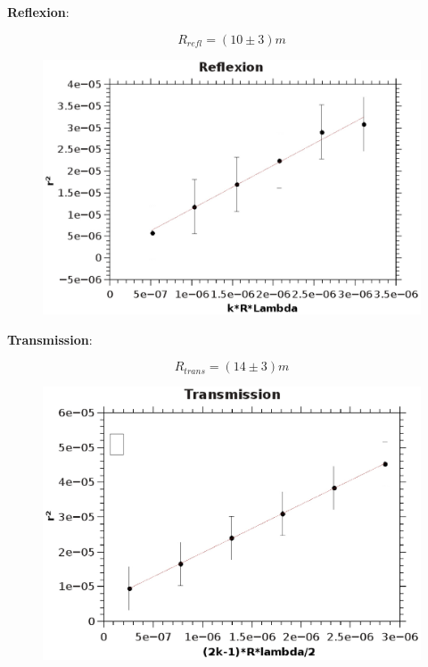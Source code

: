\documentclass{article}
\begin{document}
\textbf{Reflexion}:

$$\boxed{ R_{refl}=(10 \pm 3)m }$$
\begin{center}
\begin{figure}
\includegraphics[scale=0.7]{refl.eps}
\end{figure}
\end{center}


\textbf{Transmission}:

$$\boxed{ R_{trans}=(14 \pm 3)m }$$
\begin{center}
\begin{figure}
\includegraphics[scale=0.7]{trans.eps}
\end{figure}
\end{center}
\end{document}
